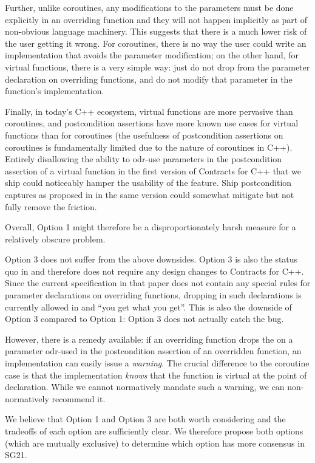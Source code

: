 Further, unlike coroutines, any modifications to the parameters must be done explicitly in an overriding function and they will not happen implicitly as part of non-obvious language machinery. This suggests that there is a much lower risk of the user getting it wrong. For coroutines, there is no way the user could write an implementation that avoids the parameter modification; on the other hand, for virtual functions, there is a very simple way: just do not drop  from the parameter declaration on overriding functions, and do not modify that parameter in the function's implementation. 

Finally, in today's C++ ecosystem, virtual functions are more pervasive than coroutines, and postcondition assertions have more known use cases for virtual functions than for coroutines (the usefulness of postcondition assertions on coroutines is fundamentally limited due to the nature of coroutines in C++). Entirely disallowing the ability to odr-use parameters in the postcondition assertion of a virtual function in the first version of Contracts for C++ that we ship could noticeably hamper the usability of the feature. Ship postcondition captures as proposed in \cite{P3098R0} in the same version could somewhat mitigate but not fully remove the friction.

Overall, Option 1 might therefore be a disproportionately harsh measure for a relatively obscure problem.

Option 3 does not suffer from the above downsides. Option 3 is also the status quo in \cite{P2900R10} and therefore does not require any design changes to Contracts for C++. Since the current specification in that paper does not contain any special rules for parameter declarations on overriding functions, dropping  in such declarations is currently allowed in \cite{P2900R10} and ``you get what you get''. This is also the downside of Option 3 compared to Option 1: Option 3 does not actually catch the bug.

However, there is a remedy available: if an overriding function drops the  on a parameter odr-used in the postcondition assertion of an overridden function, an implementation can easily issue a \emph{warning}. The crucial difference to the coroutine case is that the implementation \emph{knows} that the function is virtual at the point of declaration. While we cannot normatively mandate such a warning, we can non-normatively recommend it.

We believe that Option 1 and Option 3 are both worth considering and the tradeoffs of each option are sufficiently clear. We therefore propose both options (which are mutually exclusive) to determine which option has more consensus in SG21.

